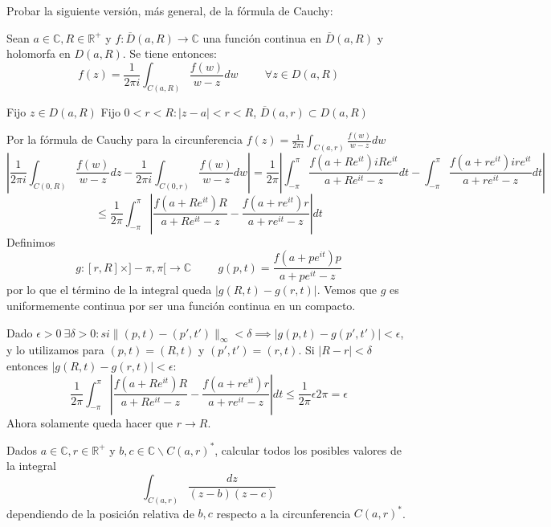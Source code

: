 \begin{ejer}
	Probar la siguiente versión, más general, de la fórmula de Cauchy:
	
	Sean $a\in\mathbb{C},R\in\mathbb{R}^+$ y $f:\overline{D}(a,R) \rightarrow \mathbb{C}$ una función continua en $\overline{D}(a,R)$ y holomorfa en $D(a,R)$. Se tiene entonces:
	$$ f(z) = \frac{1}{2\pi i} \int_{C(a,R)} \frac{f(w)}{w-z}dw \hspace{1cm} \forall z\in D(a,R) $$
\end{ejer}

\begin{sol}
	
	Fijo $z\in D(a,R)$
	Fijo $0<r<R : |z-a|<r<R$, $\overline{D}(a,r) \subset D(a,R)$
	
	Por la fórmula de Cauchy para la circunferencia $f(z) = \frac{1}{2\pi i} \int_{C(a,r)} \frac{f(w)}{w-z} dw$
	$$ \left|\frac{1}{2\pi i} \int_{C(0,R)} \frac{f(w)}{w-z} dz - \frac{1}{2\pi i} \int_{C(0,r)} \frac{f(w)}{w-z}dw \right| = \frac{1}{2\pi} \left|\int_{-\pi}^{\pi} \frac{f(a+Re^{it}) iRe^{it} }{ a+Re^{it}-z } dt - \int_{-\pi}^{\pi} \frac{f(a+re^{it}) ire^{it}}{a+re^{it}-z} dt\right|$$
	$$\leq \frac{1}{2\pi} \int_{-\pi}^{\pi} \left| \frac{f(a+Re^{it})R}{a+Re^{it}-z} -\frac{f(a+re^{it})r}{a+re^{it}-z} \right| dt$$
	Definimos
	$$g:[r,R]\times]-\pi, \pi[ \rightarrow \mathbb{C} \hspace{1cm}
	g(p,t) = \frac{f(a+pe^{it})p}{a+pe^{it}-z}$$
	por lo que el término de la integral queda $|g(R,t)-g(r,t)|$. Vemos que $g$ es uniformemente continua por ser una función continua en un compacto.
	
	Dado $\epsilon >0 \ \exists \delta>0 : si \| (p,t)-(p',t') \| _{\infty}<\delta \implies |g(p,t)-g(p',t')| < \epsilon$,
	y lo utilizamos para $(p,t)=(R,t)$ y $(p',t')=(r,t)$. Si $|R-r|<\delta$ entonces $|g(R,t)-g(r,t)| < \epsilon$:
	$$\frac{1}{2\pi} \int_{-\pi}^{\pi} \left| \frac{f(a+Re^{it})R}{a+Re^{it}-z} -\frac{f(a+re^{it})r}{a+re^{it}-z} \right| dt \leq \frac{1}{2\pi}\epsilon 2\pi = \epsilon$$
	Ahora solamente queda hacer que $r\rightarrow R$.
	
\end{sol}


\begin{ejer}
	Dados $a\in\mathbb{C}, r\in\mathbb{R}^+$ y $b,c\in\mathbb{C}\backslash C(a,r)^{\ast}$, calcular todos los posibles valores de la integral
	$$ \int_{C(a,r)} \frac{dz}{(z-b)(z-c)} $$
	dependiendo de la posición relativa de $b,c$ respecto a la circunferencia $C(a,r)^{\ast}$.
\end{ejer}

